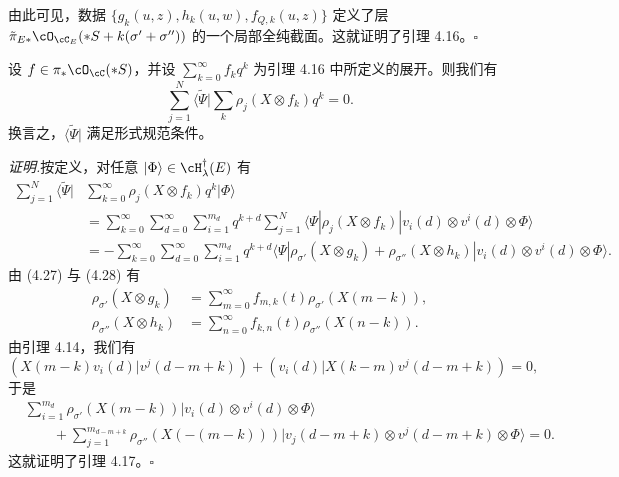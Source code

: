 
由此可见，数据 $\{g_k(u,z),h_k(u,w),f_{Q,k}(u,z)\}$ 定义了层
$\tilde\pi_{E*}\cO_{\cC_E}(*S+k(\sigma'+\sigma''))$ 的一个局部全纯截面。这就证明了引理 4.16。\hfill$\square$

\begin{lemma}[4.17]
 设 $f\in\pi_*\cO_{\cC}(*S)$，并设 $\sum_{k=0}^{\infty}f_kq^k$ 为引理 4.16 中所定义的展开。则我们有
 \[
  \sum_{j=1}^{N}\langle\tilde\Psi|\sum_{k}\rho_j(X\otimes f_k)q^k=0.
 \]
 换言之，$\langle\tilde\Psi|$ 满足形式规范条件。
\end{lemma}


\noindent\textit{证明.}\quad 按定义，对任意 $|\Phi\rangle\in\cH^\dagger_\lambda(E)$ 有
\begin{align*}
 \sum_{j=1}^{N}\langle\tilde\Psi|&\sum_{k=0}^{\infty}\rho_j(X\otimes f_k)q^k|\Phi\rangle\\
 &=\sum_{k=0}^{\infty}\sum_{d=0}^{\infty}\sum_{i=1}^{m_d}q^{k+d}\sum_{j=1}^{N}
   \langle\Psi|\rho_j(X\otimes f_k)|v_i(d)\otimes v^i(d)\otimes\Phi\rangle\\
 &=-\sum_{k=0}^{\infty}\sum_{d=0}^{\infty}\sum_{i=1}^{m_d}q^{k+d}
   \langle\Psi|\rho_{\sigma'}(X\otimes g_k)+\rho_{\sigma''}(X\otimes h_k)|v_i(d)\otimes v^i(d)\otimes\Phi\rangle.
\end{align*}
由 (4.27) 与 (4.28) 有
\begin{align*}
 \rho_{\sigma'}(X\otimes g_k)&=\sum_{m=0}^{\infty}f_{m,k}(t)\rho_{\sigma'}(X(m-k)),\\
 \rho_{\sigma''}(X\otimes h_k)&=\sum_{n=0}^{\infty}f_{k,n}(t)\rho_{\sigma''}(X(n-k)).
\end{align*}
由引理 4.14，我们有
\[
 (X(m-k)v_i(d)|v^j(d-m+k))+(v_i(d)|X(k-m)v^j(d-m+k))=0,
\]
于是
\begin{align*}
 &\sum_{i=1}^{m_d}\rho_{\sigma'}(X(m-k))|v_i(d)\otimes v^i(d)\otimes\Phi\rangle\\
 &\qquad+\sum_{j=1}^{m_{d-m+k}}\rho_{\sigma''}(X(-(m-k)))|v_j(d-m+k)\otimes v^j(d-m+k)\otimes\Phi\rangle=0.
\end{align*}
这就证明了引理 4.17。\hfill$\square$


